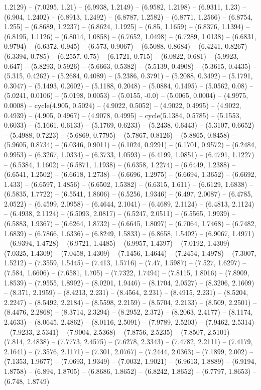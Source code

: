 1.2129) -- (7.0295, 1.21) -- (6.9938, 1.2149) -- (6.9582, 1.2198) -- (6.9311, 1.23) -- (6.904, 1.2402) -- (6.8913, 1.2492) -- (6.8787, 1.2582) -- (6.8771, 1.2566) -- (6.8754, 1.255) -- (6.8689, 1.2237) -- (6.8624, 1.1925) -- (6.85, 1.1659) -- (6.8376, 1.1394) -- (6.8195, 1.1126) -- (6.8014, 1.0858) -- (6.7652, 1.0498) -- (6.7289, 1.0138) -- (6.6831, 0.9794) -- (6.6372, 0.945) -- (6.573, 0.9067) -- (6.5088, 0.8684) -- (6.4241, 0.8267) -- (6.3394, 0.785) -- (6.2557, 0.75) -- (6.1721, 0.715) -- (6.0822, 0.681) -- (5.9923, 0.647) -- (5.8293, 0.5926) -- (5.6663, 0.5382) -- (5.5139, 0.4908) -- (5.3615, 0.4435) -- (5.315, 0.4262) -- (5.2684, 0.4089) -- (5.2386, 0.3791) -- (5.2088, 0.3492) -- (5.1791, 0.3047) -- (5.1493, 0.2602) -- (5.1188, 0.2048) -- (5.0884, 0.1495) -- (5.0562, 0.08) -- (5.0241, 0.0106) -- (5.0198, 0.0053) -- (5.0155, -0.0) -- (5.0065, 0.0004) -- (4.9975, 0.0008) -- cycle(4.905, 0.5024) -- (4.9022, 0.5052) -- (4.9022, 0.4995) -- (4.9022, 0.4939) -- (4.905, 0.4967) -- (4.9078, 0.4995) -- cycle(5.1384, 0.5785) -- (5.1553, 0.6033) -- (5.1661, 0.6133) -- (5.1769, 0.6233) -- (5.2438, 0.6443) -- (5.3107, 0.6652) -- (5.4988, 0.7223) -- (5.6869, 0.7795) -- (5.7867, 0.8126) -- (5.8865, 0.8458) -- (5.9605, 0.8734) -- (6.0346, 0.9011) -- (6.1024, 0.9291) -- (6.1701, 0.9572) -- (6.2484, 0.9953) -- (6.3267, 1.0334) -- (6.3733, 1.0593) -- (6.4199, 1.0851) -- (6.4791, 1.1227) -- (6.5384, 1.1602) -- (6.5871, 1.1938) -- (6.6358, 1.2274) -- (6.6449, 1.2388) -- (6.6541, 1.2502) -- (6.6618, 1.2738) -- (6.6696, 1.2975) -- (6.6694, 1.3652) -- (6.6692, 1.433) -- (6.6597, 1.4856) -- (6.6502, 1.5382) -- (6.6315, 1.611) -- (6.6129, 1.6838) -- (6.5835, 1.7722) -- (6.5541, 1.8606) -- (6.5256, 1.9346) -- (6.497, 2.0087) -- (6.4785, 2.0522) -- (6.4599, 2.0958) -- (6.4644, 2.1041) -- (6.4689, 2.1124) -- (6.4813, 2.1124) -- (6.4938, 2.1124) -- (6.5093, 2.0817) -- (6.5247, 2.0511) -- (6.5565, 1.9939) -- (6.5883, 1.9367) -- (6.6264, 1.8732) -- (6.6645, 1.8097) -- (6.7064, 1.7468) -- (6.7482, 1.6839) -- (6.7866, 1.6336) -- (6.8249, 1.5833) -- (6.8658, 1.5402) -- (6.9067, 1.4971) -- (6.9394, 1.4728) -- (6.9721, 1.4485) -- (6.9957, 1.4397) -- (7.0192, 1.4309) -- (7.0325, 1.4309) -- (7.0458, 1.4309) -- (7.1456, 1.4644) -- (7.2454, 1.4978) -- (7.3007, 1.5212) -- (7.3559, 1.5445) -- (7.413, 1.5716) -- (7.47, 1.5987) -- (7.527, 1.6297) -- (7.584, 1.6606) -- (7.6581, 1.705) -- (7.7322, 1.7494) -- (7.8115, 1.8016) -- (7.8909, 1.8539) -- (7.9555, 1.8992) -- (8.0201, 1.9446) -- (8.1704, 2.0527) -- (8.3206, 2.1609) -- (8.371, 2.1959) -- (8.4213, 2.231) -- (8.4564, 2.231) -- (8.4915, 2.231) -- (8.5204, 2.2247) -- (8.5492, 2.2184) -- (8.5598, 2.2159) -- (8.5704, 2.2133) -- (8.509, 2.2501) -- (8.4476, 2.2868) -- (8.3714, 2.3294) -- (8.2952, 2.372) -- (8.2063, 2.4177) -- (8.1174, 2.4633) -- (8.0645, 2.4862) -- (8.0116, 2.5091) -- (7.9789, 2.5203) -- (7.9462, 2.5314) -- (7.9233, 2.5341) -- (7.9004, 2.5368) -- (7.8756, 2.5235) -- (7.8507, 2.5101) -- (7.814, 2.4838) -- (7.7773, 2.4575) -- (7.6278, 2.3343) -- (7.4782, 2.2111) -- (7.4179, 2.1641) -- (7.3576, 2.1171) -- (7.301, 2.0767) -- (7.2444, 2.0363) -- (7.1899, 2.002) -- (7.1353, 1.9677) -- (7.0693, 1.9349) -- (7.0032, 1.9021) -- (6.9613, 1.8889) -- (6.9194, 1.8758) -- (6.894, 1.8705) -- (6.8686, 1.8652) -- (6.8242, 1.8652) -- (6.7797, 1.8653) -- (6.748, 1.8749) 